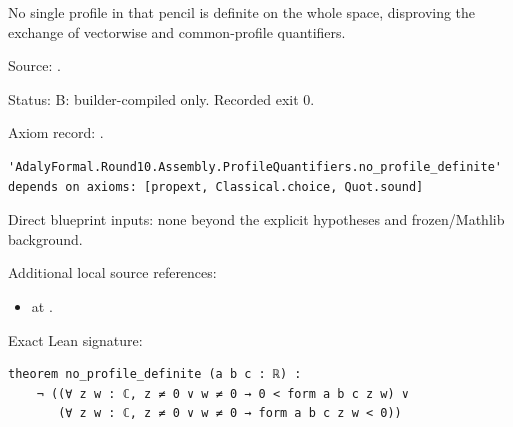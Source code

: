 \begin{theorem}[bp-180]
\label{bp-180}
\uses{}
\leanok
No single profile in that pencil is definite on the whole space, disproving the exchange of vectorwise and common-profile quantifiers.

\par Source: \texttt{}.
\par Status: B: builder-compiled only. Recorded exit 0.
\par Axiom record: \texttt{}.
\begin{verbatim}
'AdalyFormal.Round10.Assembly.ProfileQuantifiers.no_profile_definite' depends on axioms: [propext, Classical.choice, Quot.sound]
\end{verbatim}
\par Direct blueprint inputs: none beyond the explicit hypotheses and frozen/Mathlib background.
\par Additional local source references:
\begin{itemize}
\item \texttt{} at \texttt{}.
\end{itemize}
\par Exact Lean signature:
\begin{verbatim}
theorem no_profile_definite (a b c : ℝ) :
    ¬ ((∀ z w : ℂ, z ≠ 0 ∨ w ≠ 0 → 0 < form a b c z w) ∨
       (∀ z w : ℂ, z ≠ 0 ∨ w ≠ 0 → form a b c z w < 0))
\end{verbatim}
\end{theorem}

